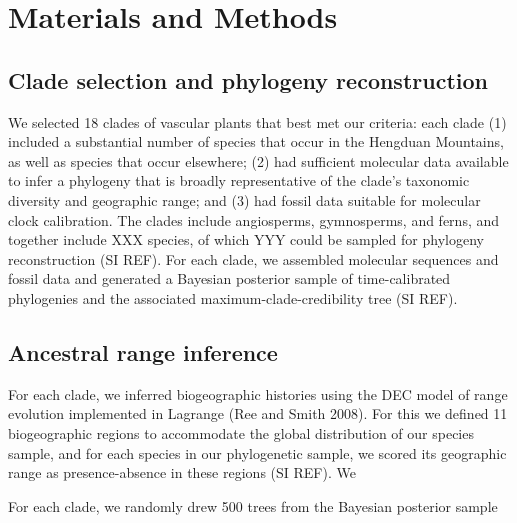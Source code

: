\section{Materials and Methods}

\subsection{Clade selection and phylogeny reconstruction}

We selected 18 clades of vascular plants that best met our criteria: each clade (1) included a substantial number of species that occur in the Hengduan Mountains, as well as species that occur elsewhere; (2) had sufficient molecular data available to infer a phylogeny that is broadly representative of the clade's taxonomic diversity and geographic range; and (3) had fossil data suitable for molecular clock calibration. The clades include angiosperms, gymnosperms, and ferns, and together include XXX species, of which YYY could be sampled for phylogeny reconstruction (SI REF). For each clade, we assembled molecular sequences and fossil data and generated a Bayesian posterior sample of time-calibrated phylogenies and the associated maximum-clade-credibility tree (SI REF).

\subsection{Ancestral range inference}

For each clade, we inferred biogeographic histories using the DEC model of range evolution implemented in Lagrange (Ree and Smith 2008). For this we defined 11 biogeographic regions to accommodate the global distribution of our species sample, and for each species in our phylogenetic sample, we scored its geographic range as presence-absence in these regions (SI REF). We 

For each clade, we randomly drew 500 trees from the Bayesian posterior sample